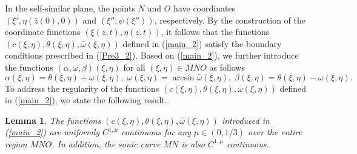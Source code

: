 \documentclass[3p,11pt]{elsarticle}
\numberwithin{equation}{section}
\newtheorem{lemma}{Lemma}[section]
\begin{document}
In the self-similar plane, the points $N$ and $O$ have coordinates $(\xi',\eta(\bar z(0),0))$ and $(\xi'',\psi(\xi''))$, respectively. By the construction of the coordinate functions $(\xi(z,t),\eta(z,t))$, it follows that the functions $(c(\xi,\eta),\theta(\xi,\eta),\bar\omega(\xi,\eta))$ defined in  (\ref{main_2}) satisfy the boundary conditions prescribed in (\ref{Pre3_2}). Based on (\ref{main_2}), we further introduce the functions $(\alpha, \omega,\beta)(\xi,\eta)$ for all $(\xi,\eta) \in \overline{MNO}$ as follows
\begin{equation}\label{main_7}
    \alpha(\xi,\eta)=\theta(\xi,\eta)+\omega(\xi,\eta),\;
    \omega(\xi,\eta)=\arcsin\bar\omega(\xi,\eta),\;
    \beta(\xi,\eta)=\theta(\xi,\eta)-\omega(\xi,\eta).
\end{equation}
To address the regularity of the functions $(c(\xi,\eta),\theta(\xi,\eta),\bar\omega(\xi,\eta))$ defined in (\ref{main_2}), we state the following result.
\begin{lemma}\label{Main_l1}
    The functions $(c(\xi,\eta),\theta(\xi,\eta),\bar\omega(\xi,\eta))$ introduced in (\ref{main_2}) are uniformly $C^{1,\mu}$ continuous for any $\mu\in(0,1/3)$ over the entire region $MNO$. In addition, the sonic curve $MN$ is also $C^{1,\mu}$ continuous.
\end{lemma}
\end{document}
